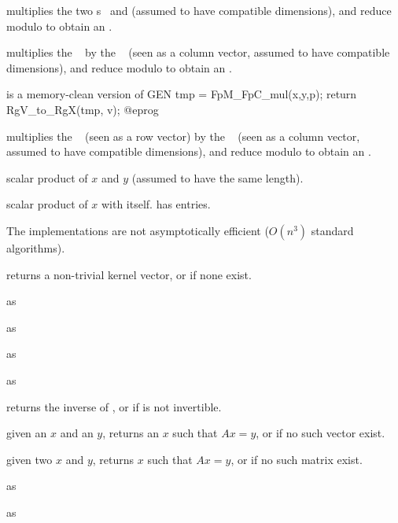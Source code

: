  multiplies the two s~
and  (assumed to have compatible dimensions), and reduce modulo
 to obtain an .

 multiplies the ~
by the ~ (seen as a column vector, assumed to have compatible
dimensions), and reduce modulo  to obtain an .

 is a memory-clean
version of
\bprog
  GEN tmp = FpM_FpC_mul(x,y,p);
  return RgV_to_RgX(tmp, v);
@eprog

 multiplies the ~
(seen as a row vector) by the ~ (seen as a column vector,
assumed to have compatible dimensions), and reduce modulo  to obtain
an .

 scalar product of
$x$ and $y$ (assumed to have the same length).

 scalar product of $x$ with itself.
has  entries.

 The implementations are not
asymptotically efficient ($O(n^3)$ standard algorithms).

 returns a non-trivial kernel vector,
or  if none exist.

 as 

 as 

 as 

 as 

 returns the inverse of , or
 if  is not invertible.

 given an  $x$ and an  $y$, returns an $x$ such that $Ax =
 y$, or  if no such vector exist.

given two  $x$ and $y$, returns $x$ such that $Ax = y$, or 
if no such matrix exist.

 as 

 as 

